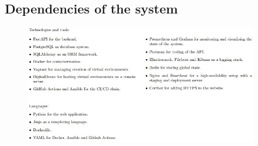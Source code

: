 \documentclass{article}
\begin{document}
\subsection{Dependencies of the system}

\begin{figure}[h]
\includegraphics[width=0.9\textwidth]{images/Technologies and tools.jpg}
\centering
\end{figure}


\end{document}
